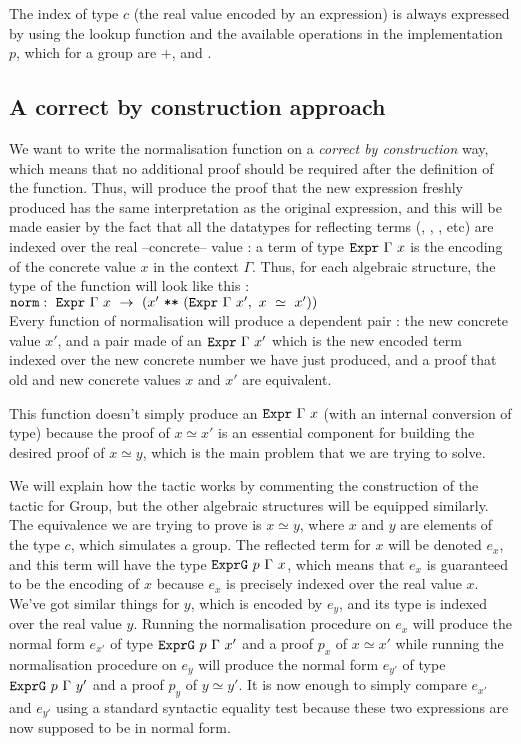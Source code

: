 The index of type $c$ (the real value encoded by an expression) is always expressed by using the lookup function  and the available operations in the implementation $p$, which for a group are $+$,  and .

	\subsection{A correct by construction approach}
\label{sect:correctByConstruction}

We want to write the normalisation function on a \emph{correct by construction} way, which means that no additional proof should be required after the definition of the function. Thus,  will produce the proof that the new expression freshly produced has the same interpretation as the original expression, and this will be made easier by the fact that all the datatypes for reflecting terms (, , , etc) are indexed over the real --concrete-- value : a term of type ${\mbox{\texttt{Expr}}}\ \Gamma\ x$ is the encoding of the concrete value $x$ in the context $\Gamma$.
Thus, for each algebraic structure, the type of the function  will look like this : \\
$\code{norm} :\ \code{Expr}\ \Gamma\ x\ \rightarrow\ (x'\ \code{**}\ (\code{Expr}\ \Gamma\ x',\ x\ \simeq\ x'))$ \\
Every function of normalisation  will produce a dependent pair : the new concrete value $x'$, and a pair made of an $\code{Expr}\ \Gamma\ x'$ which is the new encoded term indexed over the new concrete number we have just produced, and a proof that old and new concrete values $x$ and $x'$ are equivalent.

This function doesn't simply produce an ${\mbox{\texttt{Expr}}}\ \Gamma\ x$ (with an internal conversion of type) because the proof of $x \simeq x'$ is an essential component for building the desired proof of $x \simeq y$, which is the main problem that we are trying to solve.


We will explain how the tactic works by commenting the construction of the tactic for Group, but the other algebraic structures will be equipped similarly. The equivalence we are trying to prove is $x \simeq y$, where $x$ and $y$ are elements of the type $c$, which  simulates a group. The reflected term for $x$ will be denoted $e_x$, and this term will have the type ${\mbox{\texttt{ExprG}}}\ p\ \Gamma\ x$, which means that $e_x$ is guaranteed to be the encoding of $x$ because $e_x$ is precisely indexed over the real value $x$.
We've got similar things for $y$, which is encoded by $e_y$, and its type is indexed over the real value $y$.
Running the normalisation procedure on $e_x$ will produce the normal form $e_{x'}$ of type ${\mbox{\texttt{ExprG}}}\ p\ \Gamma\ x'$ and a proof $p_x$ of $x \simeq x'$ while running the normalisation procedure on $e_y$ will produce the normal form $e_{y'}$ of type ${\mbox{\texttt{ExprG}}}\ p\ \Gamma\ y'$ and a proof $p_y$ of $y \simeq y'$.
It is now enough to simply compare $e_{x'}$ and $e_{y'}$ using a standard syntactic equality test  because these two expressions are now supposed to be in normal form.

